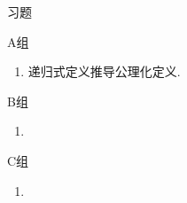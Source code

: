 \centerline{\heiti \Large 习题}
\vspace{2ex}
{\kaishu }
\begin{flushright}
    \kaishu

\end{flushright}
\centerline{\heiti A组}
\begin{enumerate}
    \item 递归式定义推导公理化定义.
\end{enumerate}
\centerline{\heiti B组}
\begin{enumerate}
    \item
\end{enumerate}
\centerline{\heiti C组}
\begin{enumerate}
    \item
\end{enumerate}
